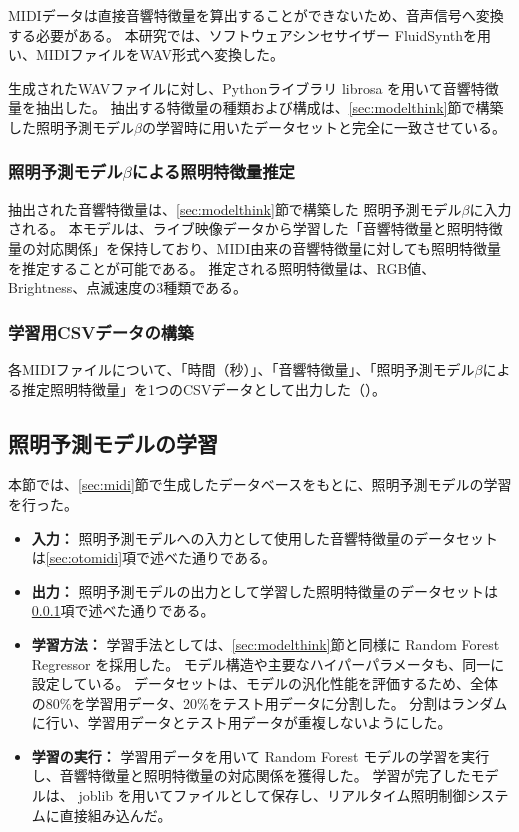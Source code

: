 MIDIデータは直接音響特徴量を算出することができないため、音声信号へ変換する必要がある。
本研究では、ソフトウェアシンセサイザー FluidSynth\cite{FluidSynthSoftwareSynthesizer}を用い、MIDIファイルをWAV形式へ変換した。

生成されたWAVファイルに対し、Pythonライブラリ librosa を用いて音響特徴量を抽出した。
抽出する特徴量の種類および構成は、\ref{sec:modelthink}節で構築した照明予測モデル$\beta$の学習時に用いたデータセットと完全に一致させている。


\subsubsection{照明予測モデル$\beta$による照明特徴量推定} \label{sec:lightmidi}

抽出された音響特徴量は、\ref{sec:modelthink}節で構築した 照明予測モデル$\beta$に入力される。
本モデルは、ライブ映像データから学習した「音響特徴量と照明特徴量の対応関係」を保持しており、MIDI由来の音響特徴量に対しても照明特徴量を推定することが可能である。
推定される照明特徴量は、RGB値、Brightness、点滅速度の3種類である。

\subsubsection{学習用CSVデータの構築}

各MIDIファイルについて、「時間（秒）」、「音響特徴量」、「照明予測モデル$\beta$による推定照明特徴量」を1つのCSVデータとして出力した（）。

\subsection{照明予測モデルの学習} \label{sec:midimodel}

本節では、\ref{sec:midi}節で生成したデータベースをもとに、照明予測モデルの学習を行った。

\begin{itemize}
	\item \textbf{入力：}
		照明予測モデルへの入力として使用した音響特徴量のデータセットは\ref{sec:otomidi}項で述べた通りである。
	\item \textbf{出力：}
		照明予測モデルの出力として学習した照明特徴量のデータセットは\ref{sec:lightmidi}項で述べた通りである。
	\item \textbf{学習方法：}
		学習手法としては、\ref{sec:modelthink}節と同様に Random Forest Regressor を採用した。
        モデル構造や主要なハイパーパラメータも、同一に設定している。
        データセットは、モデルの汎化性能を評価するため、全体の80\%を学習用データ、20\%をテスト用データに分割した。
        分割はランダムに行い、学習用データとテスト用データが重複しないようにした。
	\item \textbf{学習の実行：}
		学習用データを用いて Random Forest モデルの学習を実行し、音響特徴量と照明特徴量の対応関係を獲得した。
        学習が完了したモデルは、 joblib を用いてファイルとして保存し、リアルタイム照明制御システムに直接組み込んだ。
\end{itemize}

